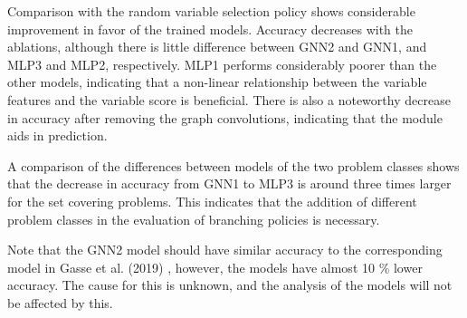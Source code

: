 Comparison with the random variable selection policy shows considerable improvement in favor of the trained models. Accuracy decreases with the ablations, although there is little difference between GNN2 and GNN1, and MLP3 and MLP2, respectively. MLP1 performs considerably poorer than the other models, indicating that a non-linear relationship between the variable features and the variable score is beneficial. There is also a noteworthy decrease in accuracy after removing the graph convolutions, indicating that the module aids in prediction.

A comparison of the differences between models of the two problem classes shows that the decrease in accuracy from GNN1 to MLP3 is around three times larger for the set covering problems. This indicates that the addition of different problem classes in the evaluation of branching policies is necessary.

Note that the GNN2 model should have similar accuracy to the corresponding model in Gasse et al. (2019) \cite{gasse2019exact}, however, the models have almost 10 \% lower accuracy. The cause for this is unknown, and the analysis of the models will not be affected by this. 

\begin{comment}
    
\begin{figure}
    \begin{tikzpicture}
      \begin{axis}[
        mlineplot,
        ylabel={Accuracy [\%]},
        xlabel={Top k},
        width=\textwidth,
        height=7cm,
	    ymin=0.0,   ymax=1.0,
	    xtick=data,
	    legend style={at={(0.01,0.9)},anchor=west}
      ]
        \addplot plot coordinates{(1, 0.413) (2, 0.538) (3, 0.621) (4, 0.681) (5, 0.732) (6, 0.770) (7, 0.800) (8, 0.827) (9, 0.849) (10, 0.867)};
        \addplot plot coordinates{(1, 0.437) (2, 0.568) (3, 0.653) (4, 0.717) (5, 0.767) (6, 0.805) (7, 0.835) (8, 0.860) (9, 0.881) (10, 0.899)};
        \addplot plot coordinates{(1, 0.435) (2, 0.568) (3, 0.652) (4, 0.716) (5, 0.765) (6, 0.802) (7, 0.831) (8, 0.858) (9, 0.879) (10, 0.897)};
        \addplot+ plot coordinates{(1, 0.019) (2, 0.034) (3, 0.047) (4, 0.060) (5, 0.071) (6, 0.081) (7, 0.090) (8, 0.098) (9, 0.107) (10, 0.115)};
        \legend{MLP1,MLP2,MLP3,Random}
        
      \end{axis}
    \end{tikzpicture}
    \caption{Top k accuracy of trained models and random variable selection on test set. MLP2 and MLP3 nearly indistinguishable.}
    \label{fig:topk}
\end{figure}
\end{comment}


